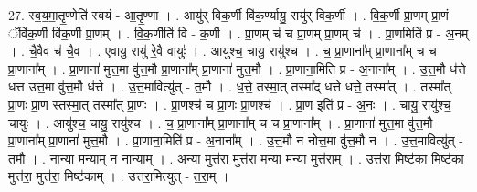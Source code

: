 \documentclass[17pt]{extarticle}
\begin{document}
27. स्व॒य॒मा॒तृ॒ण्णेति॑ स्वयं - आ॒तृ॒ण्णा । . आयु॑र् विक॒र्णी वि॑क॒र्ण्यायु॒ रायु॑र् विक॒र्णी । . वि॒क॒र्णी प्रा॒णम् प्रा॒णं ॅवि॑क॒र्णी वि॑क॒र्णी प्रा॒णम् । . वि॒क॒र्णीति॑ वि - क॒र्णी । . प्रा॒णम् च॑ च प्रा॒णम् प्रा॒णम् च॑ । . प्रा॒णमिति॑ प्र - अ॒नम् । . चै॒वैव च॑ चै॒व । . ए॒वायु॒ रायु॑ रे॒वै वायुः॑ । . आयु॑श्च॒ चायु॒ रायु॑श्च । . च॒ प्रा॒णाना᳚म् प्रा॒णाना᳚म् च च प्रा॒णाना᳚म् । . प्रा॒णाना॑ मुत्त॒मा वु॑त्त॒मौ प्रा॒णाना᳚म् प्रा॒णाना॑ मुत्त॒मौ । . प्रा॒णाना॒मिति॑ प्र - अ॒नाना᳚म् । . उ॒त्त॒मौ ध॑त्ते धत्त उत्त॒मा वु॑त्त॒मौ ध॑त्ते । . उ॒त्त॒मावित्यु॑त् - त॒मौ । . ध॒त्ते॒ तस्मा॒त् तस्मा᳚द् धत्ते धत्ते॒ तस्मा᳚त् । . तस्मा᳚त् प्रा॒णः प्रा॒ण स्तस्मा॒त् तस्मा᳚त् प्रा॒णः । . प्रा॒णश्च॑ च प्रा॒णः प्रा॒णश्च॑ । . प्रा॒ण इति॑ प्र - अ॒नः । . चायु॒ रायु॑श्च॒ चायुः॑ । . आयु॑श्च॒ चायु॒ रायु॑श्च । . च॒ प्रा॒णाना᳚म् प्रा॒णाना᳚म् च च प्रा॒णाना᳚म् । . प्रा॒णाना॑ मुत्त॒मा वु॑त्त॒मौ प्रा॒णाना᳚म् प्रा॒णाना॑ मुत्त॒मौ । . प्रा॒णाना॒मिति॑ प्र - अ॒नाना᳚म् । . उ॒त्त॒मौ न नोत्त॒मा वु॑त्त॒मौ न । . उ॒त्त॒मावित्यु॑त् - त॒मौ । . नान्या म॒न्याम् न नान्याम् । . अ॒न्या मुत्त॑रा॒ मुत्त॑रा म॒न्या म॒न्या मुत्त॑राम् । . उत्त॑रा॒ मिष्ट॑का॒ मिष्ट॑का॒ मुत्त॑रा॒ मुत्त॑रा॒ मिष्ट॑काम् । . उत्त॑रा॒मित्युत् - त॒रा॒म् । \newline
\end{document}
